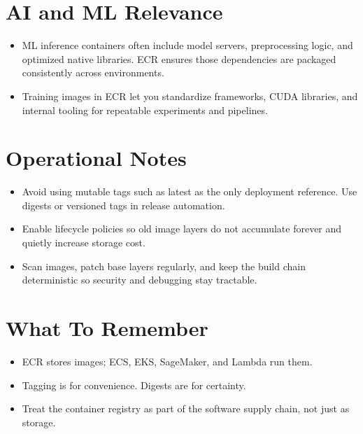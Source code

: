 \documentclass[10pt,twocolumn]{article}
\begin{document}
\section*{AI and ML Relevance}
\begin{itemize}
\item ML inference containers often include model servers, preprocessing logic, and optimized native libraries. ECR ensures those dependencies are packaged consistently across environments.
\item Training images in ECR let you standardize frameworks, CUDA libraries, and internal tooling for repeatable experiments and pipelines.
\end{itemize}

\section*{Operational Notes}
\begin{itemize}
\item Avoid using mutable tags such as latest as the only deployment reference. Use digests or versioned tags in release automation.
\item Enable lifecycle policies so old image layers do not accumulate forever and quietly increase storage cost.
\item Scan images, patch base layers regularly, and keep the build chain deterministic so security and debugging stay tractable.
\end{itemize}

\section*{What To Remember}
\begin{itemize}
\item ECR stores images; ECS, EKS, SageMaker, and Lambda run them.
\item Tagging is for convenience. Digests are for certainty.
\item Treat the container registry as part of the software supply chain, not just as storage.
\end{itemize}
\end{document}
